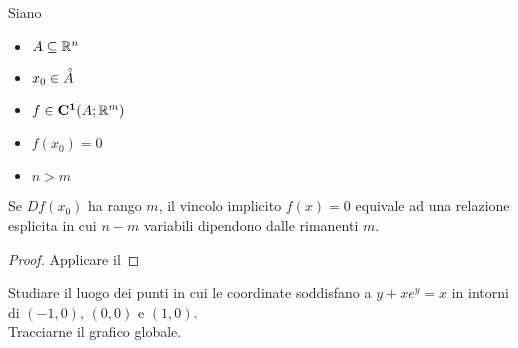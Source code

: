 \begin{corollary}
	Siano
	\begin{itemize}[noitemsep]
		\item $A \subseteq \mathbb{R}^n$
		\item $x_0 \in \accentset{\circ}{A}$
		\item $f \in \mathbf{C^{1}}(A;\mathbb{R}^m)$
		\item $f(x_0) = 0$
		\item $n > m$
	\end{itemize}
	Se $Df(x_0)$ ha rango $m$, il vincolo implicito $f(x) = 0$ equivale ad una relazione esplicita in cui $n - m$ variabili dipendono dalle rimanenti $m$.
	\begin{proof}
		Applicare il  %
	\end{proof}
\end{corollary}
\begin{exercise}
	Studiare il luogo dei punti in cui le coordinate soddisfano a $y + xe^y = x$ in intorni di $(-1,0)$, $(0,0)$ e $(1,0)$.\\
	Tracciarne il grafico globale.
\end{exercise}

